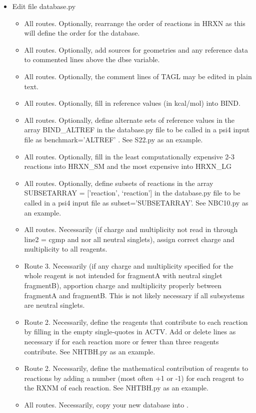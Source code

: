 \documentclass[letterpaper,10pt,english]{sphinxmanual}
\begin{document}
\begin{itemize}
\item {} 
Edit file database.py
\begin{itemize}
\item {} 
All routes. Optionally, rearrange the order of reactions in HRXN as this will define the order for the database.

\item {} 
All routes. Optionally, add sources for geometries and any reference data to commented lines above the dbse variable.

\item {} 
All routes. Optionally, the comment lines of TAGL may be edited in plain text.

\item {} 
All routes. Optionally, fill in reference values (in kcal/mol) into BIND.

\item {} 
All routes. Optionally, define alternate sets of reference values in the array BIND\_ALTREF in the database.py file to be called in a psi4 input file as benchmark='ALTREF' . See S22.py as an example.

\item {} 
All routes. Optionally, fill in the least computationally expensive 2-3 reactions into HRXN\_SM and the most expensive into HRXN\_LG

\item {} 
All routes. Optionally, define subsets of reactions in the array SUBSETARRAY = {[}'reaction', `reaction'{]} in the database.py file to be called in a psi4 input file as subset='SUBSETARRAY'. See NBC10.py as an example.

\item {} 
All routes. Necessarily (if charge and multiplicity not read in through line2 = cgmp and nor all neutral singlets), assign correct charge and multiplicity to all reagents.

\item {} 
Route 3. Necessarily (if any charge and multiplicity specified for the whole reagent is not intended for fragmentA with neutral singlet fragmentB), apportion charge and multiplicity properly between fragmentA and fragmentB. This is not likely necessary if all subsystems are neutral singlets.

\item {} 
Route 2. Necessarily, define the reagents that contribute to each reaction by filling in the empty single-quotes in ACTV. Add or delete lines as necessary if for each reaction more or fewer than three reagents contribute. See NHTBH.py as an example.

\item {} 
Route 2. Necessarily, define the mathematical contribution of reagents to reactions by adding a number (most often +1 or -1) for each reagent to the RXNM of each reaction. See NHTBH.py as an example.

\item {} 
All routes. Necessarily, copy your new database into .

\end{itemize}

\end{itemize}
\end{document}
